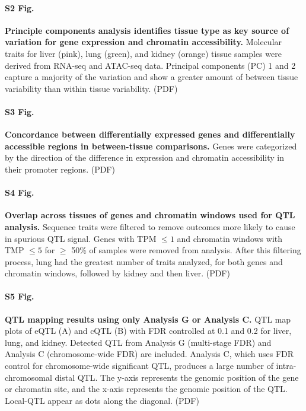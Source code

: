 \documentclass[10pt,letterpaper]{article}
\begin{document}
\paragraph*{S2 Fig.}
\label{S_pca}
{\bf Principle components analysis identifies tissue type as key source of variation for gene expression and chromatin accessibility.} 
Molecular traits for liver (pink), lung (green), and kidney (orange) tissue samples were derived from RNA-seq and ATAC-seq data. Principal components (PC) 1 and 2 capture a majority of the variation and show a greater amount of between tissue variability than within tissue variability. (PDF)

\paragraph*{S3 Fig.}
\label{S_de_concordance}
{\bf Concordance between differentially expressed genes and differentially accessible regions in between-tissue comparisons.} 
Genes were categorized by the direction of the difference in expression and chromatin accessibility in their promoter regions. (PDF)

\paragraph*{S4 Fig.}
\label{S_upset_outcomes}
{\bf Overlap across tissues of genes and chromatin windows used for QTL analysis.} 
Sequence traits were filtered to remove outcomes more likely to cause in spurious QTL signal. Genes with TPM $\le 1$ and chromatin windows with TMP $\le 5$ for $\ge$ 50\% of samples were removed from analysis. After this filtering process, lung had the greatest number of traits analyzed, for both genes and chromatin windows, followed by kidney and then liver. (PDF)

\paragraph*{S5 Fig.}
\label{S_grid_plot_lenient}
{\bf QTL mapping results using only Analysis G or Analysis C.}
QTL map plots of eQTL (A) and cQTL (B) with FDR controlled at 0.1 and 0.2 for liver, lung, and kidney. Detected QTL from Analysis G (multi-stage FDR) and Analysis C (chromosome-wide FDR) are included. Analysis C, which uses FDR control for chromosome-wide significant QTL, produces a large number of intra-chromosomal distal QTL. The y-axis represents the genomic position of the gene or chromatin site, and the x-axis represents the genomic position of the QTL. Local-QTL appear as dots along the diagonal. (PDF)
\end{document}
